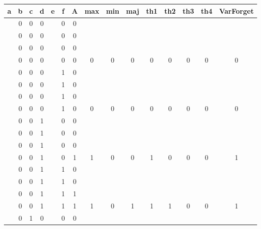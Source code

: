 \begin{table}[!tb]
    \centering
    \begin{tabular}{|c|c|c|c|c|c|c|c|c|c|c|c|c|c|c|}
        \hline
        \textbf{a} & \textbf{b} & \textbf{c} & \textbf{d} & \textbf{e} & \textbf{f} & \textbf{A} & \textbf{max} & \textbf{min} & \textbf{maj} & \textbf{th1} & \textbf{th2} & \textbf{th3} & \textbf{th4} & \textbf{VarForget} \\ \hline
        \rowcolor{gray!40}  & 0 & 0 & 0 &  & 0 & 0 &  &  &  &  &  &  &  &  \\ \hline
        \rowcolor{gray!40}  & 0 & 0 & 0 &  & 0 & 0 &  &  &  &  &  &  &  &  \\ \hline
        \rowcolor{gray!40}  & 0 & 0 & 0 &  & 0 & 0 &  &  &  &  &  &  &  &  \\ \hline
        \rowcolor{gray!40}  & 0 & 0 & 0 &  & 0 & 0 & 0 & 0 & 0 & 0 & 0 & 0 & 0 & 0 \\ \hline
        \rowcolor{blue!40}  & 0 & 0 & 0 &  & 1 & 0 &  &  &  &  &  &  &  &  \\ \hline
        \rowcolor{blue!40}  & 0 & 0 & 0 &  & 1 & 0 &  &  &  &  &  &  &  &  \\ \hline
        \rowcolor{blue!40}  & 0 & 0 & 0 &  & 1 & 0 &  &  &  &  &  &  &  &  \\ \hline
        \rowcolor{blue!40}  & 0 & 0 & 0 &  & 1 & 0 & 0 & 0 & 0 & 0 & 0 & 0 & 0 & 0 \\ \hline
        \rowcolor{red!40}  & 0 & 0 & 1 &  & 0 & 0 &  &  &  &  &  &  &  &  \\ \hline
        \rowcolor{red!40}  & 0 & 0 & 1 &  & 0 & 0 &  &  &  &  &  &  &  &  \\ \hline
        \rowcolor{red!40}  & 0 & 0 & 1 &  & 0 & 0 &  &  &  &  &  &  &  &  \\ \hline
        \rowcolor{red!40}  & 0 & 0 & 1 &  & 0 & 1 & 1 & 0 & 0 & 1 & 0 & 0 & 0 & 1 \\ \hline
        \rowcolor{green!40}  & 0 & 0 & 1 &  & 1 & 0 &  &  &  &  &  &  &  &  \\ \hline
        \rowcolor{green!40}  & 0 & 0 & 1 &  & 1 & 0 &  &  &  &  &  &  &  &  \\ \hline
        \rowcolor{green!40}  & 0 & 0 & 1 &  & 1 & 1 &  &  &  &  &  &  &  &  \\ \hline
        \rowcolor{green!40}  & 0 & 0 & 1 &  & 1 & 1 & 1 & 0 & 1 & 1 & 1 & 0 & 0 & 1 \\ \hline
        \rowcolor{yellow!40}  & 0 & 1 & 0 &  & 0 & 0 &  &  &  &  &  &  &  &  \\ \hline

\end{tabular}
\end{table}
